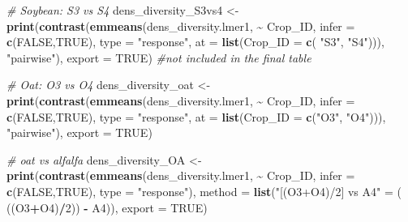 \documentclass[
]{article}
\newenvironment{Shaded}{\begin{snugshade}}{\end{snugshade}}
\newcommand{\AttributeTok}[1]{\textcolor[rgb]{0.13,0.29,0.53}{#1}}
\newcommand{\CommentTok}[1]{\textcolor[rgb]{0.56,0.35,0.01}{\textit{#1}}}
\newcommand{\ConstantTok}[1]{\textcolor[rgb]{0.56,0.35,0.01}{#1}}
\newcommand{\DecValTok}[1]{\textcolor[rgb]{0.00,0.00,0.81}{#1}}
\newcommand{\FunctionTok}[1]{\textcolor[rgb]{0.13,0.29,0.53}{\textbf{#1}}}
\newcommand{\NormalTok}[1]{#1}
\newcommand{\OtherTok}[1]{\textcolor[rgb]{0.56,0.35,0.01}{#1}}
\newcommand{\SpecialCharTok}[1]{\textcolor[rgb]{0.81,0.36,0.00}{\textbf{#1}}}
\newcommand{\StringTok}[1]{\textcolor[rgb]{0.31,0.60,0.02}{#1}}
\begin{document}
\begin{Shaded}
\begin{Highlighting}[]
\CommentTok{\# Soybean: S3 vs S4}
\NormalTok{dens\_diversity\_S3vs4 }\OtherTok{\textless{}{-}}\FunctionTok{print}\NormalTok{(}\FunctionTok{contrast}\NormalTok{(}\FunctionTok{emmeans}\NormalTok{(dens\_diversity.lmer1, }\SpecialCharTok{\textasciitilde{}}\NormalTok{ Crop\_ID,}
                                              \AttributeTok{infer =} \FunctionTok{c}\NormalTok{(}\ConstantTok{FALSE}\NormalTok{,}\ConstantTok{TRUE}\NormalTok{), }
                                              \AttributeTok{type =} \StringTok{"response"}\NormalTok{,}
                                              \AttributeTok{at =} \FunctionTok{list}\NormalTok{(}\AttributeTok{Crop\_ID =} \FunctionTok{c}\NormalTok{( }\StringTok{"S3"}\NormalTok{, }\StringTok{"S4"}\NormalTok{))), }\StringTok{"pairwise"}\NormalTok{),}
                             \AttributeTok{export =} \ConstantTok{TRUE}\NormalTok{) }\CommentTok{\#not included in the final table}


\CommentTok{\# Oat: O3 vs O4}
\NormalTok{dens\_diversity\_oat }\OtherTok{\textless{}{-}} \FunctionTok{print}\NormalTok{(}\FunctionTok{contrast}\NormalTok{(}\FunctionTok{emmeans}\NormalTok{(dens\_diversity.lmer1, }\SpecialCharTok{\textasciitilde{}}\NormalTok{ Crop\_ID,}
                                             \AttributeTok{infer =} \FunctionTok{c}\NormalTok{(}\ConstantTok{FALSE}\NormalTok{,}\ConstantTok{TRUE}\NormalTok{), }
                                             \AttributeTok{type =} \StringTok{"response"}\NormalTok{, }
                                             \AttributeTok{at =} \FunctionTok{list}\NormalTok{(}\AttributeTok{Crop\_ID =} \FunctionTok{c}\NormalTok{(}\StringTok{"O3"}\NormalTok{, }\StringTok{"O4"}\NormalTok{))), }\StringTok{"pairwise"}\NormalTok{), }
                            \AttributeTok{export =} \ConstantTok{TRUE}\NormalTok{)}

\CommentTok{\# oat vs alfalfa}
\NormalTok{dens\_diversity\_OA }\OtherTok{\textless{}{-}} \FunctionTok{print}\NormalTok{(}\FunctionTok{contrast}\NormalTok{(}\FunctionTok{emmeans}\NormalTok{(dens\_diversity.lmer1, }\SpecialCharTok{\textasciitilde{}}\NormalTok{ Crop\_ID,}
                                            \AttributeTok{infer =} \FunctionTok{c}\NormalTok{(}\ConstantTok{FALSE}\NormalTok{,}\ConstantTok{TRUE}\NormalTok{), }
                                            \AttributeTok{type =} \StringTok{"response"}\NormalTok{), }
                                    \AttributeTok{method =} \FunctionTok{list}\NormalTok{(}\StringTok{"[(O3+O4)/2] vs A4"} \OtherTok{=}\NormalTok{ ( ((O3}\SpecialCharTok{+}\NormalTok{O4)}\SpecialCharTok{/}\DecValTok{2}\NormalTok{)) }\SpecialCharTok{{-}}\NormalTok{ A4)),}
                           \AttributeTok{export =} \ConstantTok{TRUE}\NormalTok{)}



\end{Highlighting}
\end{Shaded}
\end{document}
